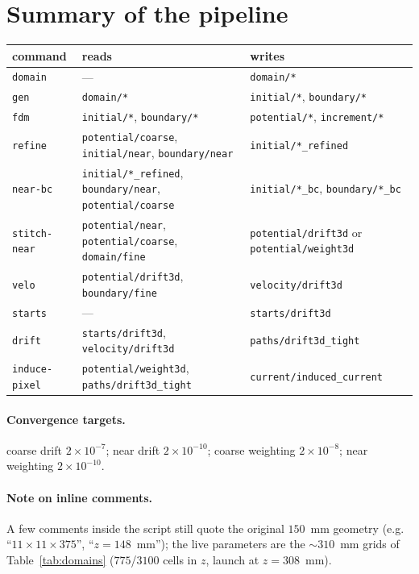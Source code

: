 \documentclass[11pt]{article}
\newcommand{\key}[1]{\texttt{#1}}
\newcommand{\cmd}[1]{\texttt{#1}}
\begin{document}
\section{Summary of the pipeline}

\begin{longtable}{@{}lll@{}}
\toprule
command & reads & writes \\
\midrule
\endhead
\cmd{domain}      & --- & \key{domain/*} \\
\cmd{gen}         & \key{domain/*} & \key{initial/*}, \key{boundary/*} \\
\cmd{fdm}         & \key{initial/*}, \key{boundary/*} & \key{potential/*}, \key{increment/*} \\
\cmd{refine}      & \key{potential/coarse}, \key{initial/near}, \key{boundary/near} & \key{initial/*\_refined} \\
\cmd{near-bc}     & \key{initial/*\_refined}, \key{boundary/near}, \key{potential/coarse} & \key{initial/*\_bc}, \key{boundary/*\_bc} \\
\cmd{stitch-near} & \key{potential/near}, \key{potential/coarse}, \key{domain/fine} & \key{potential/drift3d} or \key{potential/weight3d} \\
\cmd{velo}        & \key{potential/drift3d}, \key{boundary/fine} & \key{velocity/drift3d} \\
\cmd{starts}      & --- & \key{starts/drift3d} \\
\cmd{drift}       & \key{starts/drift3d}, \key{velocity/drift3d} & \key{paths/drift3d\_tight} \\
\cmd{induce-pixel}& \key{potential/weight3d}, \key{paths/drift3d\_tight} & \key{current/induced\_current} \\
\bottomrule
\end{longtable}

\paragraph{Convergence targets.} coarse drift $2\times10^{-7}$; near drift
$2\times10^{-10}$; coarse weighting $2\times10^{-8}$; near weighting
$2\times10^{-10}$.

\paragraph{Note on inline comments.} A few comments inside the script
still quote the original $150$~mm geometry (e.g. ``$11\times11\times375$'',
``$z=148$~mm''); the live parameters are the $\sim310$~mm grids of
Table~\ref{tab:domains} ($775$/$3100$ cells in $z$, launch at $z=308$~mm).
\end{document}
